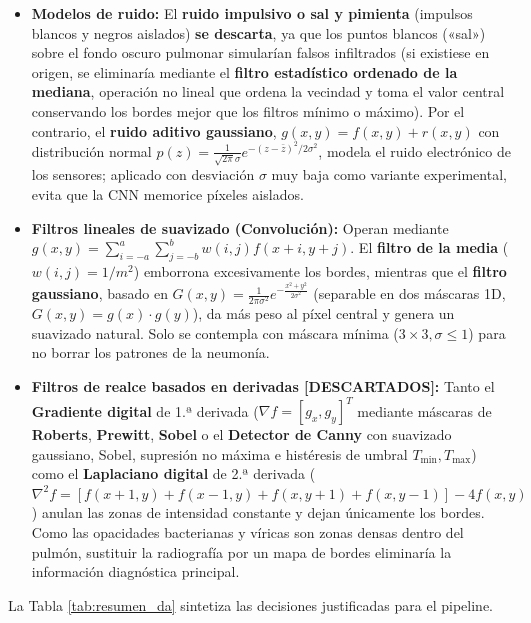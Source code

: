 \documentclass[11pt, a4paper]{article}
\numberwithin{equation}{section}
\begin{document}
\begin{itemize}
    \item \textbf{Modelos de ruido:} El \textbf{ruido impulsivo o sal y pimienta} (impulsos blancos y negros aislados) \textbf{se descarta}, ya que los puntos blancos («sal») sobre el fondo oscuro pulmonar simularían falsos infiltrados (si existiese en origen, se eliminaría mediante el \textbf{filtro estadístico ordenado de la mediana}, operación no lineal que ordena la vecindad y toma el valor central conservando los bordes mejor que los filtros mínimo o máximo). Por el contrario, el \textbf{ruido aditivo gaussiano}, $g(x,y) = f(x,y) + r(x,y)$ con distribución normal $p(z) = \frac{1}{\sqrt{2\pi}\sigma} e^{-(z-\bar{z})^2 / 2\sigma^2}$, modela el ruido electrónico de los sensores; aplicado con desviación $\sigma$ muy baja como variante experimental, evita que la CNN memorice píxeles aislados.
    \item \textbf{Filtros lineales de suavizado (Convolución):} Operan mediante $g(x,y) = \sum_{i=-a}^{a} \sum_{j=-b}^{b} w(i,j) f(x+i, y+j)$. El \textbf{filtro de la media} ($w(i,j) = 1/m^2$) emborrona excesivamente los bordes, mientras que el \textbf{filtro gaussiano}, basado en $G(x,y) = \frac{1}{2\pi\sigma^2} e^{-\frac{x^2+y^2}{2\sigma^2}}$ (separable en dos máscaras 1D, $G(x,y)=g(x)\cdot g(y)$), da más peso al píxel central y genera un suavizado natural. Solo se contempla con máscara mínima ($3\times 3, \sigma \le 1$) para no borrar los patrones de la neumonía.
    \item \textbf{Filtros de realce basados en derivadas [DESCARTADOS]:} Tanto el \textbf{Gradiente digital} de 1.ª derivada ($\nabla f = [g_x, g_y]^T$ mediante máscaras de \textbf{Roberts}, \textbf{Prewitt}, \textbf{Sobel} o el \textbf{Detector de Canny} con suavizado gaussiano, Sobel, supresión no máxima e histéresis de umbral $T_{\min}, T_{\max}$) como el \textbf{Laplaciano digital} de 2.ª derivada ($\nabla^2 f = [f(x+1,y)+f(x-1,y)+f(x,y+1)+f(x,y-1)]-4f(x,y)$) anulan las zonas de intensidad constante y dejan únicamente los bordes. Como las opacidades bacterianas y víricas son zonas densas dentro del pulmón, sustituir la radiografía por un mapa de bordes eliminaría la información diagnóstica principal.
\end{itemize}

La Tabla \ref{tab:resumen_da} sintetiza las decisiones justificadas para el pipeline.
\end{document}
